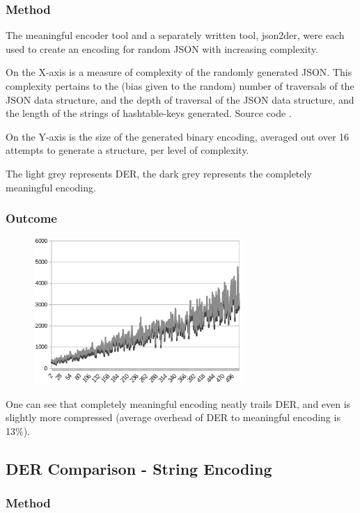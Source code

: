 \subsubsection{Method}

The meaningful encoder tool and a separately written tool, json2der, were
each used to create an encoding for random JSON with increasing complexity.

On the X-axis is a measure of complexity of the randomly generated
JSON. This complexity pertains to the (bias given to the random) number
of traversals of
the JSON data structure, and the
depth of traversal of the JSON data structure, and the length
of the strings of hashtable-keys generated. Source code \cite{bib:randomizer}.

On the Y-axis is the size of the generated binary encoding, averaged
out over 16 attempts to generate a structure, per level of complexity.

The light grey represents DER, the dark grey represents the completely
meaningful encoding.

\subsubsection{Outcome}

\begin{figure}[H]
\centering
\includegraphics[width=80mm]{comparison_chart}
\end{figure}

One can see that completely meaningful encoding neatly trails DER, and
even is slightly more compressed (average overhead of DER to meaningful
encoding is 13\%).

\subsection{DER Comparison - String Encoding}

\subsubsection{Method}

